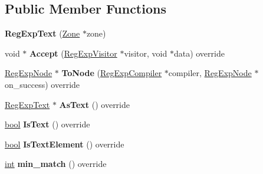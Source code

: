\subsection*{Public Member Functions}
\begin{DoxyCompactItemize}
\item 
\mbox{\label{classv8_1_1internal_1_1RegExpText_a0324310cc71e60bd7b4809c422d23d32}} 
{\bfseries Reg\+Exp\+Text} (\mbox{\hyperlink{classv8_1_1internal_1_1Zone}{Zone}} $\ast$zone)
\item 
\mbox{\label{classv8_1_1internal_1_1RegExpText_aea179b143ae81674b36bb232fc7faefa}} 
void $\ast$ {\bfseries Accept} (\mbox{\hyperlink{classv8_1_1internal_1_1RegExpVisitor}{Reg\+Exp\+Visitor}} $\ast$visitor, void $\ast$data) override
\item 
\mbox{\label{classv8_1_1internal_1_1RegExpText_a6ea6b99a77e2b5fd64a5d29837be5ff7}} 
\mbox{\hyperlink{classv8_1_1internal_1_1RegExpNode}{Reg\+Exp\+Node}} $\ast$ {\bfseries To\+Node} (\mbox{\hyperlink{classv8_1_1internal_1_1RegExpCompiler}{Reg\+Exp\+Compiler}} $\ast$compiler, \mbox{\hyperlink{classv8_1_1internal_1_1RegExpNode}{Reg\+Exp\+Node}} $\ast$on\+\_\+success) override
\item 
\mbox{\label{classv8_1_1internal_1_1RegExpText_a92671346bcc28980f0f6fce28a1f1bbe}} 
\mbox{\hyperlink{classv8_1_1internal_1_1RegExpText}{Reg\+Exp\+Text}} $\ast$ {\bfseries As\+Text} () override
\item 
\mbox{\label{classv8_1_1internal_1_1RegExpText_acba0fe87d94d0d3d2273c1c756b3b4fb}} 
\mbox{\hyperlink{classbool}{bool}} {\bfseries Is\+Text} () override
\item 
\mbox{\label{classv8_1_1internal_1_1RegExpText_a9656a07fc9368d7d4b2cec3959fde1c9}} 
\mbox{\hyperlink{classbool}{bool}} {\bfseries Is\+Text\+Element} () override
\item 
\mbox{\label{classv8_1_1internal_1_1RegExpText_aa314a4eba4ea4c94205347204cc2d102}} 
\mbox{\hyperlink{classint}{int}} {\bfseries min\+\_\+match} () override

\end{DoxyCompactItemize}
